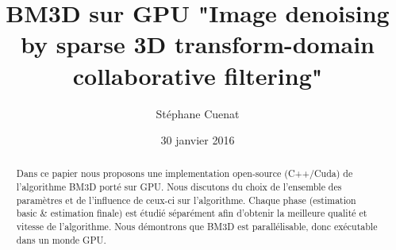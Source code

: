 \documentclass[12pt,a4paper]{memoir} %
\begin{document}
\title{BM3D sur GPU "Image denoising by sparse 3D transform-domain collaborative filtering"}
\author{\small{Stéphane Cuenat}}
\date{\small{30 janvier 2016}}
\maketitle

\begin{abstract}
Dans ce papier nous proposons une implementation open-source (C++/Cuda) de l'algorithme BM3D porté sur GPU. Nous discutons du choix de l'ensemble des paramètres et de l'influence de ceux-ci sur l'algorithme. Chaque phase (estimation basic \& estimation finale) est étudié séparément afin d'obtenir la meilleure qualité et vitesse de l'algorithme. Nous démontrons que BM3D est parallélisable, donc exécutable dans un monde GPU.   

\end{abstract}

\newpage

\tableofcontents







\begin{appendix}
  \listoffigures
\end{appendix}



\end{document}
